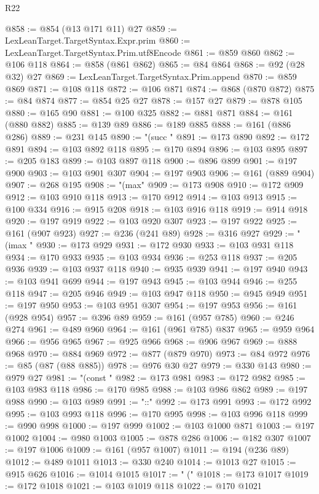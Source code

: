 \begin{lexlean}{R22}
\begin{coremodule}
{{{{{{{{{{{{{{{{{{{{{{{{{{{{{{{{{{{{{{{{{{{{{{{{{{{{@858 := @854 (@13 @171 @11) @27
@859 := LexLeanTarget.TargetSyntax.Expr.prim
@860 := LexLeanTarget.TargetSyntax.Prim.utf8Encode
@861 := @859 @860
@862 := @106 @118
@864 := @858 (@861 @862)
@865 := @84 @864
@868 := @92 (@28 @32) @27
@869 := LexLeanTarget.TargetSyntax.Prim.append
@870 := @859 @869
@871 := @108 @118
@872 := @106 @871
@874 := @868 (@870 @872)
@875 := @84 @874
@877 := @854 @25 @27
@878 := @157 @27
@879 := @878 @105
@880 := @165 @90
@881 := @100 @325
@882 := @881 @871
@884 := @161 (@880 @882)
@885 := @139 @89
@886 := @189 @885
@888 := @161 (@886 @286)
@889 := @231 @145
@890 := "(succ "
@891 := @173 @890
@892 := @172 @891
@894 := @103 @892 @118
@895 := @170 @894
@896 := @103 @895
@897 := @205 @183
@899 := @103 @897 @118
@900 := @896 @899
@901 := @197 @900
@903 := @103 @901 @307
@904 := @197 @903
@906 := @161 (@889 @904)
@907 := @268 @195
@908 := "(max"
@909 := @173 @908
@910 := @172 @909
@912 := @103 @910 @118
@913 := @170 @912
@914 := @103 @913
@915 := @100 @334
@916 := @915 @208
@918 := @103 @916 @118
@919 := @914 @918
@920 := @197 @919
@922 := @103 @920 @307
@923 := @197 @922
@925 := @161 (@907 @923)
@927 := @236 (@241 @89)
@928 := @316 @927
@929 := "(imax "
@930 := @173 @929
@931 := @172 @930
@933 := @103 @931 @118
@934 := @170 @933
@935 := @103 @934
@936 := @253 @118
@937 := @205 @936
@939 := @103 @937 @118
@940 := @935 @939
@941 := @197 @940
@943 := @103 @941 @699
@944 := @197 @943
@945 := @103 @944
@946 := @255 @118
@947 := @205 @946
@949 := @103 @947 @118
@950 := @945 @949
@951 := @197 @950
@953 := @103 @951 @307
@954 := @197 @953
@956 := @161 (@928 @954)
@957 := @396 @89
@959 := @161 (@957 @785)
@960 := @246 @274
@961 := @489 @960
@964 := @161 (@961 @785) @837
@965 := @959 @964
@966 := @956 @965
@967 := @925 @966
@968 := @906 @967
@969 := @888 @968
@970 := @884 @969
@972 := @877 (@879 @970)
@973 := @84 @972
@976 := @85 (@87 (@88 @885))
@978 := @976 @30 @27
@979 := @330 @143
@980 := @979 @27
@981 := "(const "
@982 := @173 @981
@983 := @172 @982
@985 := @103 @983 @118
@986 := @170 @985
@988 := @103 @986 @862
@989 := @197 @988
@990 := @103 @989
@991 := "::"
@992 := @173 @991
@993 := @172 @992
@995 := @103 @993 @118
@996 := @170 @995
@998 := @103 @996 @118
@999 := @990 @998
@1000 := @197 @999
@1002 := @103 @1000 @871
@1003 := @197 @1002
@1004 := @980 @1003
@1005 := @878 @286
@1006 := @182 @307
@1007 := @197 @1006
@1009 := @161 (@957 @1007)
@1011 := @194 (@236 @89)
@1012 := @489 @1011
@1013 := @330 @240
@1014 := @1013 @27
@1015 := @915 @626
@1016 := @1014 @1015
@1017 := " ("
@1018 := @173 @1017
@1019 := @172 @1018
@1021 := @103 @1019 @118
@1022 := @170 @1021
}}}}}}}}}}}}}}}}}}}}}}}}}}}}}}}}}}}}}}}}}}}}}}}}}}}}
\end{coremodule}
\end{lexlean}
